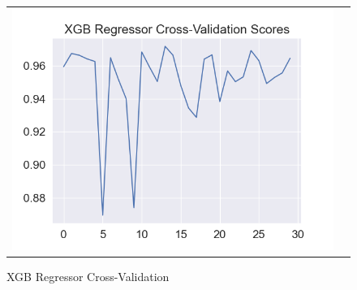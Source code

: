 \documentclass[conference]{IEEEtran}
\begin{document}
\begin{figure}[!h]
	\centering
	\begin{center}
		\begin{tabular}{cc}
			\includegraphics[scale=0.5]{pictures/pic_12.png}&
		\end{tabular}
	\end{center}
	\caption{XGB Regressor Cross-Validation}
	\label{fig:12}
\end{figure}
\end{document}

